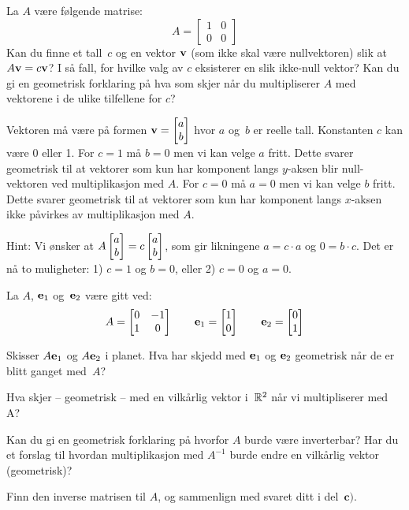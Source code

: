 \begin{oppgave}
La $A$ være følgende matrise:
\[
A=\begin{bmatrix}
1 & 0\\
0 & 0
\end{bmatrix}
\]
Kan du finne et tall~$c$ og en vektor $\mathbf{v}$ (som ikke skal være
nullvektoren) slik at $A\mathbf{v}=c\mathbf{v}$?  I så fall, for hvilke valg av
$c$ eksisterer en slik ikke-null vektor? Kan du gi en geometrisk
forklaring på hva som skjer når du multipliserer $A$ med vektorene i
de ulike tilfellene for $c$?
\end{oppgave}



\begin{losning}

Vektoren må være på formen $\mathbf{v}=\begin{bmatrix} a \\ b \end{bmatrix}$ hvor $a$ og~$b$ er reelle tall. Konstanten $c$ kan være 0 eller 1. For $c=1$ må $b=0$ men vi kan velge $a$ fritt. Dette svarer geometrisk til at vektorer som kun har komponent langs $y$-aksen blir null-vektoren ved multiplikasjon med $A$. For $c=0$ må $a=0$ men vi kan velge $b$ fritt. Dette svarer geometrisk til at vektorer som kun har komponent langs $x$-aksen ikke påvirkes av multiplikasjon med $A$.


Hint: Vi ønsker at $A\begin{bmatrix} a \\ b \end{bmatrix}=c\begin{bmatrix} a \\ b \end{bmatrix}$, som gir likningene $a=c\cdot a$ og $0=b\cdot c$. Det er nå to muligheter: 1) $c=1$ og $b=0$, eller 2) $c=0$ og $a=0$.



\end{losning}




\begin{oppgave}
La $A$, $\mathbf{e}_1$ og~$\mathbf{e}_2$ være gitt ved:
\[
A=\begin{bmatrix}
0 & -1\\
1 & 0
\end{bmatrix}
\qquad
\mathbf{e}_1 = \begin{bmatrix} 1 \\ 0 \end{bmatrix}
\qquad
\mathbf{e}_2 = \begin{bmatrix} 0 \\ 1 \end{bmatrix}
\]

\begin{punkt}
Skisser $A \mathbf{e}_1$ og $A \mathbf{e}_2$ i planet. Hva har skjedd med
$\mathbf{e}_1$ og $\mathbf{e}_2$ geometrisk når de er blitt ganget med~$A$?
\end{punkt}

\begin{punkt}
Hva skjer -- geometrisk -- med en vilkårlig vektor i~$\mathbb{R}^2$ når vi
multipliserer med A?
\end{punkt}

\begin{punkt}
Kan du gi en geometrisk forklaring på hvorfor $A$ burde være inverterbar? Har du et forslag til hvordan multiplikasjon med $A^{-1}$ burde endre en vilkårlig vektor (geometrisk)?
\end{punkt}

\begin{punkt}
Finn den inverse matrisen til $A$, og sammenlign med svaret ditt i
del~$\textbf{c)}$.
\end{punkt}

\end{oppgave}

